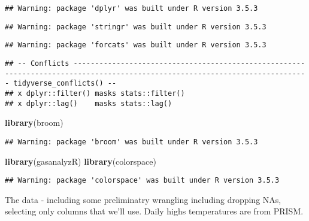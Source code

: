 \documentclass[]{article}
\newenvironment{Shaded}{\begin{snugshade}}{\end{snugshade}}
\newcommand{\KeywordTok}[1]{\textcolor[rgb]{0.13,0.29,0.53}{\textbf{#1}}}
\newcommand{\NormalTok}[1]{#1}
\begin{document}
\begin{verbatim}
## Warning: package 'dplyr' was built under R version 3.5.3
\end{verbatim}

\begin{verbatim}
## Warning: package 'stringr' was built under R version 3.5.3
\end{verbatim}

\begin{verbatim}
## Warning: package 'forcats' was built under R version 3.5.3
\end{verbatim}

\begin{verbatim}
## -- Conflicts ----------------------------------------------------------------------------------------------------------------------------- tidyverse_conflicts() --
## x dplyr::filter() masks stats::filter()
## x dplyr::lag()    masks stats::lag()
\end{verbatim}

\begin{Shaded}
\begin{Highlighting}[]
\KeywordTok{library}\NormalTok{(broom)}
\end{Highlighting}
\end{Shaded}

\begin{verbatim}
## Warning: package 'broom' was built under R version 3.5.3
\end{verbatim}

\begin{Shaded}
\begin{Highlighting}[]
\KeywordTok{library}\NormalTok{(gasanalyzR)}
\KeywordTok{library}\NormalTok{(colorspace)}
\end{Highlighting}
\end{Shaded}

\begin{verbatim}
## Warning: package 'colorspace' was built under R version 3.5.3
\end{verbatim}

The data - including some preliminatry wrangling including dropping NAs,
selecting only columns that we'll use. Daily highs temperatures are from
PRISM.
\end{document}
